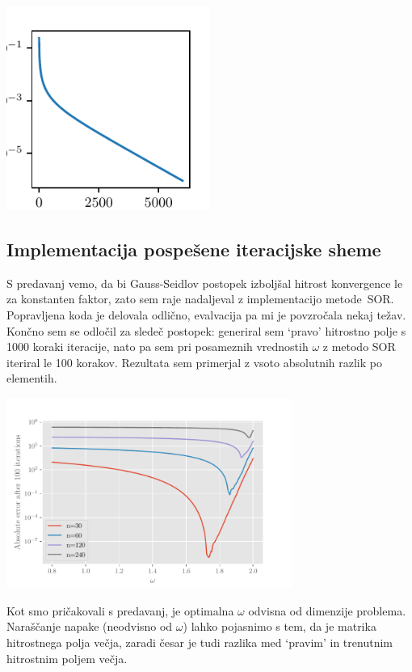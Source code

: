 \begin{center}
    \includegraphics[width=0.5\textwidth]{../old/1-errors.pdf}
\end{center}
\subsection{Implementacija pospešene iteracijske sheme}
S predavanj vemo, da bi Gauss-Seidlov postopek izboljšal hitrost konvergence le za konstanten faktor, zato sem raje nadaljeval z implementacijo metode~SOR. Popravljena koda je delovala odlično, evalvacija pa mi je povzročala nekaj težav. Končno sem se odločil za sledeč postopek: generiral sem `pravo' hitrostno polje s 1000 koraki iteracije, nato pa sem pri posameznih vrednostih $\omega$ z metodo SOR iteriral le 100 korakov. Rezultata sem primerjal z vsoto absolutnih razlik po elementih.
\begin{center}
    \includegraphics[width=0.7\textwidth]{../old/1-omegas.pdf}
\end{center}
Kot smo pričakovali s predavanj, je optimalna $\omega$ odvisna od dimenzije problema. Naraščanje napake (neodvisno od $\omega$) lahko pojasnimo s tem, da je matrika hitrostnega polja večja, zaradi česar je tudi razlika med `pravim' in trenutnim hitrostnim poljem večja.

